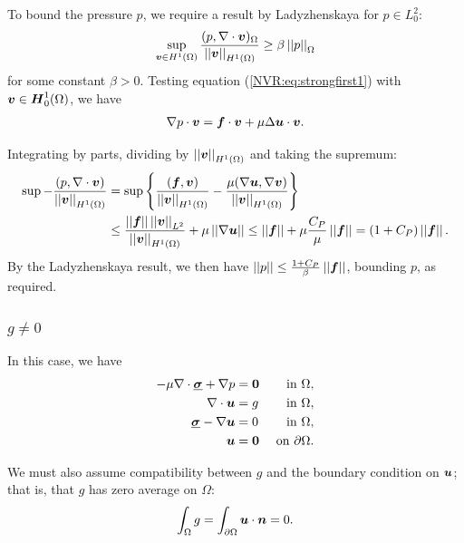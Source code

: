 To bound the pressure $p$, we require a result by Ladyzhenskaya for $p \in L^{2}_{0}$:
\begin{align*}
\sup_{\vect{v} \in H^{1}(\Omega)} \frac{(p, \NVRdiv \vect{v})_{\Omega}}{\norm{ \vect{v} }_{H^{1}(\Omega)} } \geq \beta \norm{p}_{\Omega}
\end{align*}
for some constant $\beta > 0$.  Testing equation (\ref{NVR:eq:strongfirst1}) with $\vect{v} \in \vect{H}^{1}_{0}(\Omega)$, we have
\begin{align*}
\NVRgrad p \cdot \vect{v} = \vect{f} \cdot \vect{v} + \mu \Delta \vect{u} \cdot \vect{v}.
\end{align*}

Integrating by parts, dividing by $\norm{ \vect{v} }_{H^{1}(\Omega)}$ and taking the supremum:
\begin{align*}
\sup - \frac{(p, \NVRdiv \vect{v})}{\norm{ \vect{v} }_{H^{1}(\Omega)}} &= \sup \left\{\frac{(\vect{f}, \vect{v})}{\norm{ \vect{v} }_{H^{1}(\Omega)}} - \frac{\mu (\NVRgrad \vect{u}, \NVRgrad \vect{v})}{\norm{ \vect{v} }_{H^{1}(\Omega)}}\right\} \\
&\leq \frac{\norm{\vect{f}} \norm{\vect{v}}_{L^{2}}}{\norm{ \vect{v} }_{H^{1}(\Omega)}} + \mu \norm{\NVRgrad \vect{u}} \leq \norm{\vect{f} } + \mu \frac{C_{P}}{\mu} \norm{\vect{f}} = (1 + C_{P}) \norm{\vect{f}}.
\end{align*}
By the Ladyzhenskaya result, we then have $\norm{p} \leq \frac{1 + C_{P}}{\beta} \norm{\vect{f}}$, bounding $p$, as required.

\subsubsection{$ g \neq 0$} In this case, we have
\begin{align}
- \mu \NVRdiv \NVRtensor{\sigma} + \NVRgrad p &= \vect{0} & \text{ in } \Omega, \label{NVR:eq:gstrongfirst} \\
\NVRdiv \vect{u} &= g & \text{ in } \Omega, \\
\NVRtensor{\sigma} - \NVRgrad \vect{u} &= 0 & \text{ in } \Omega,\\
\vect{u} &= \vect{0} & \text{ on } \partial\Omega.\label{NVR:eq:gstronglast}
\end{align}

We must also assume compatibility between $g$ and the boundary condition on $\vect{u}$; that is, that $g$ has zero average on $\Omega$:
\begin{align*}
\int_{\Omega} g = \int_{\partial \Omega} \vect{u} \cdot \vect{n} = 0.
\end{align*}

